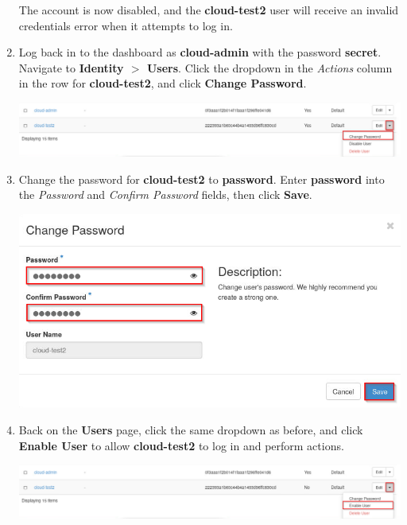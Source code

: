 \documentclass[letterpaper, 12pt]{article}
\begin{document}
\begin{enumerate}
    \begin{notebox}
        The account is now disabled, and the \textbf{cloud-test2} user will receive an invalid credentials error when it attempts to log in.
    \end{notebox}

    \item Log back in to the dashboard as \textbf{cloud-admin} with the password \textbf{secret}.
    Navigate to \textbf{Identity $>$ Users}.
    Click the dropdown in the \textit{Actions} column in the row for \textbf{cloud-test2}, and click \textbf{Change Password}.

    \begin{center}
        \includegraphics[width=\linewidth]{images/part3/step15.png}
    \end{center}

    \item Change the password for \textbf{cloud-test2} to \textbf{password}.
    Enter \textbf{password} into the
    \textit{Password} and \textit{Confirm Password} fields, then click \textbf{Save}.

    \begin{center}
        \includegraphics[width=\linewidth]{images/part3/step16.png}
    \end{center}

    \item Back on the \textbf{Users} page, click the same dropdown as before, and click \textbf{Enable User} to allow \textbf{cloud-test2} to log in and perform actions.

    \begin{center}
        \includegraphics[width=\linewidth]{images/part3/step17.png}
    \end{center}


\end{enumerate}
\end{document}
